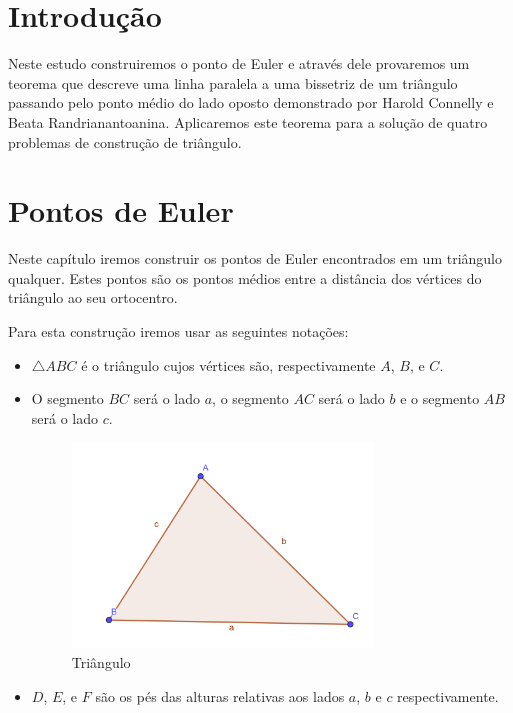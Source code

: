 \documentclass[12pt, openright, a4paper, brazil, openany, oneside]{abntex2}
\begin{document}


\frenchspacing 
\imprimircapa
\imprimirfolhaderosto*
\ABNTEXchapterfont
{}
\tableofcontents*
\cleardoublepage
\textual

\chapter*[Introdução]{Introdução}


Neste estudo construiremos o ponto de Euler e através dele provaremos um teorema que descreve uma linha paralela a uma bissetriz de um triângulo passando pelo ponto médio do lado oposto demonstrado por Harold Connelly e Beata Randrianantoanina\cite{con2}. Aplicaremos este teorema para a solução de quatro problemas de construção de triângulo.



\chapter{Pontos de Euler}

Neste capítulo iremos construir os pontos de Euler encontrados em um triângulo qualquer. Estes pontos são os pontos médios entre a distância dos vértices do triângulo ao seu ortocentro.

Para esta construção iremos usar as seguintes notações:

\begin{itemize}
\item $\triangle ABC$ é o triângulo cujos vértices são, respectivamente $A$, $B$, e $C$.
\item O segmento $BC$ será o lado $a$, o segmento $AC$ será o lado $b$ e o segmento $AB$ será o lado $c$.

\begin{figure}[h]

    \center

    \includegraphics[width=8cm]{triangulo1.png}
    \caption{Triângulo \label{tria1}}
    
\end{figure}

\item $D$, $E$, e $F$ são os pés das alturas relativas aos lados $a$, $b$ e $c$ respectivamente.


\end{itemize} 
\end{document}
